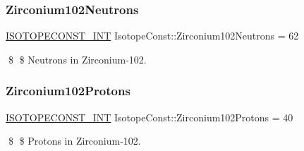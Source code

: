 \subsubsection{\texorpdfstring{Zirconium102\+Neutrons}{Zirconium102Neutrons}}
{\footnotesize\ttfamily \mbox{\hyperlink{group___isotope_const-_macros_ga5f18360b3e99483a35c32d789e62621c}{I\+S\+O\+T\+O\+P\+E\+C\+O\+N\+S\+T\+\_\+\+I\+NT}} Isotope\+Const\+::\+Zirconium102\+Neutrons = 62}

\$ \$ Neutrons in Zirconium-\/102. \mbox{\label{group___isotope_const-_zirconium-_zr102_ga035b7fab1e47c9f0e38c1d3305ca6eb5}} 
\subsubsection{\texorpdfstring{Zirconium102\+Protons}{Zirconium102Protons}}
{\footnotesize\ttfamily \mbox{\hyperlink{group___isotope_const-_macros_ga5f18360b3e99483a35c32d789e62621c}{I\+S\+O\+T\+O\+P\+E\+C\+O\+N\+S\+T\+\_\+\+I\+NT}} Isotope\+Const\+::\+Zirconium102\+Protons = 40}

\$ \$ Protons in Zirconium-\/102. 